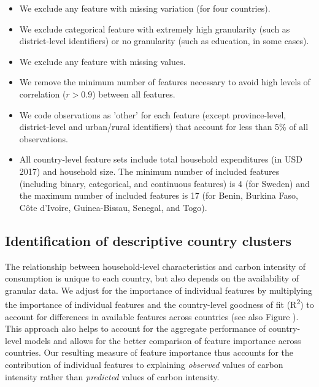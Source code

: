 \documentclass[12pt, a4paper]{article}
\begin{document}
\begin{refsection}
\begin{itemize}
    \item We exclude any feature with missing variation (for four countries).
    \item We exclude categorical feature with extremely high granularity (such as district-level identifiers) or no granularity (such as education, in some cases).
    \item We exclude any feature with missing values.
    \item We remove the minimum number of features necessary to avoid high levels of correlation ($r>0.9$) between all features.
    \item We code observations as 'other' for each feature (except province-level, district-level and urban/rural identifiers) that account for less than 5\% of all observations.
    \item All country-level feature sets include total household expenditures (in USD 2017) and household size. The minimum number of included features (including binary, categorical, and continuous features) is 4 (for Sweden) and the maximum number of included features is 17 (for Benin, Burkina Faso, Côte d'Ivoire, Guinea-Bissau, Senegal, and Togo).
\end{itemize}

\subsection{Identification of descriptive country clusters}\label{sec:country_clusters}

The relationship between household-level characteristics and carbon intensity of consumption is unique to each country, but also depends on the availability of granular data. We adjust for the importance of individual features by multiplying the importance of individual features and the country-level goodness of fit (R\textsuperscript{2}) to account for differences in available features across countries (see also Figure ). This approach also helps to account for the aggregate performance of country-level models and allows for the better comparison of feature importance across countries. Our resulting measure of feature importance thus accounts for the contribution of individual features to explaining \textit{observed} values of carbon intensity rather than \textit{predicted} values of carbon intensity.


\end{refsection}
\end{document}

